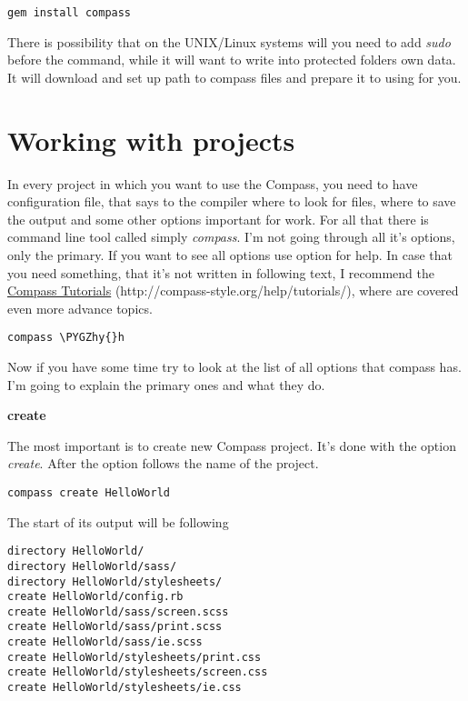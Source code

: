 \documentclass[a4paper,12pt,oneside]{sphinxmanual}
\def\PYGZhy{\char`\-}
\begin{document}
\begin{Verbatim}[commandchars=\\\{\}]
gem install compass
\end{Verbatim}

There is possibility that on the UNIX/Linux systems will you need to add \emph{sudo} before the command, while it will want to write into protected folders own data. It will download and set up path to compass files and prepare it to using for you.


\section{Working with projects}
\label{src/compass:working-with-projects}
In every project in which you want to use the Compass, you need to have configuration file, that says to the compiler where to look for files, where to save the output and some other options important for work. For all that there is command line tool called simply \emph{compass}. I'm not going through all it's options, only the primary. If you want to see all options use option for help. In case that you need something, that it's not written in following text, I recommend the \href{http://compass-style.org/help/tutorials/}{Compass Tutorials} (http://compass-style.org/help/tutorials/), where are covered even more advance topics.

\begin{Verbatim}[commandchars=\\\{\}]
compass \PYGZhy{}h
\end{Verbatim}

Now if you have some time try to look at the list of all options that compass has. I'm going to explain the primary ones and what they do.

\textbf{create}

The most important is to create new Compass project. It's done with the option \emph{create}. After the option follows the name of the project.

\begin{Verbatim}[commandchars=\\\{\}]
compass create HelloWorld
\end{Verbatim}

The start of its output will be following

\begin{Verbatim}[commandchars=\\\{\}]
directory HelloWorld/
directory HelloWorld/sass/
directory HelloWorld/stylesheets/
create HelloWorld/config.rb
create HelloWorld/sass/screen.scss
create HelloWorld/sass/print.scss
create HelloWorld/sass/ie.scss
create HelloWorld/stylesheets/print.css
create HelloWorld/stylesheets/screen.css
create HelloWorld/stylesheets/ie.css
\end{Verbatim}
\end{document}
